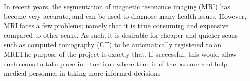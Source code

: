 In recent years, the segmentation of magnetic resonance imaging (MRI) has become very accurate, and can be used to diagnose many health issues. However, MRI faces a few problems; namely that it is time consuming and expensive compared to other scans. As such, it is desirable for cheaper and quicker scans such as computed tomography (CT) to be automatically registered to an MRI.\@ The purpose of the project is exactly that. If successful, this would allow such scans to take place in situations where time is of the essence and help medical personnel in taking more informed decisions.
